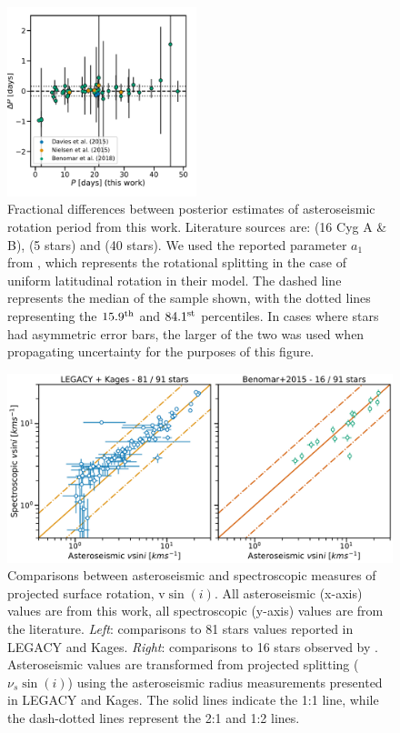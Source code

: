 \begin{figure}
 \centering
 \includegraphics[width=0.49\textwidth]{Images/seis_comparison_rot_alt2.pdf}
 \caption{Fractional differences between posterior estimates of asteroseismic rotation period from this work. Literature sources are: \cite{davies+2015} (16 Cyg A \& B), \cite{nielsen+2015} (5 stars) and \cite{benomar+2018} (40 stars). We used the reported parameter $a_{1}$ from \cite{benomar+2018}, which represents the rotational splitting in the case of uniform latitudinal rotation in their model. The dashed line represents the median of the sample shown, with the dotted lines representing the $15.9^{\rm{th}}$ and $84.1^{\rm{st}}$ percentiles. In cases where stars had asymmetric error bars, the larger of the two was used when propagating uncertainty for the purposes of this figure.}
 \label{fig:literaturecomp}
\end{figure}

 
 \begin{figure}
 	\centering
 	\includegraphics[width=\textwidth]{Images/vsini-comparison.pdf}
 	\caption{Comparisons between asteroseismic and spectroscopic measures of projected surface rotation, $\textrm{v}\sin(i)$. All asteroseismic (x-axis) values are from this work, all spectroscopic (y-axis) values are from the literature. \textit{Left}: comparisons to 81 stars values reported in LEGACY and Kages. \textit{Right}: comparisons to 16 stars observed by \cite{benomar+2015}. Asteroseismic values are transformed from projected splitting ($\nu_s\sin(i)$) using the asteroseismic radius measurements presented in LEGACY and Kages. The solid lines indicate the 1:1 line, while the dash-dotted lines represent the 2:1 and 1:2 lines.}
 	\label{fig:vsinilit}
 \end{figure}

%
 